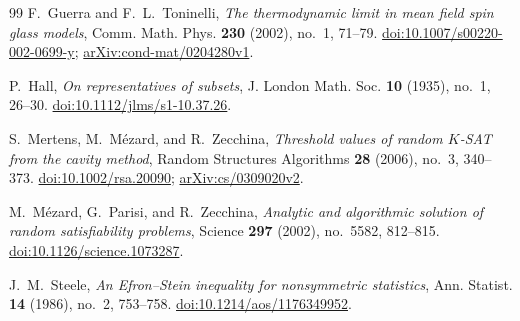 \begin{thebibliography}{99}
F.~Guerra and F.~L.~Toninelli,
\emph{The thermodynamic limit in mean field spin glass models},
Comm. Math. Phys. \textbf{230} (2002), no.~1, 71--79.
\href{https://doi.org/10.1007/s00220-002-0699-y}
{doi:10.1007/s00220-002-0699-y};
\href{https://arxiv.org/abs/cond-mat/0204280v1}{arXiv:cond-mat/0204280v1}.

P.~Hall,
\emph{On representatives of subsets},
J. London Math. Soc. \textbf{10} (1935), no.~1, 26--30.
\href{https://doi.org/10.1112/jlms/s1-10.37.26}{doi:10.1112/jlms/s1-10.37.26}.

S.~Mertens, M.~M\'ezard, and R.~Zecchina,
\emph{Threshold values of random \(K\)-SAT from the cavity method},
Random Structures Algorithms \textbf{28} (2006), no.~3, 340--373.
\href{https://doi.org/10.1002/rsa.20090}{doi:10.1002/rsa.20090};
\href{https://arxiv.org/abs/cs/0309020v2}{arXiv:cs/0309020v2}.

M.~M\'ezard, G.~Parisi, and R.~Zecchina,
\emph{Analytic and algorithmic solution of random satisfiability problems},
Science \textbf{297} (2002), no.~5582, 812--815.
\href{https://doi.org/10.1126/science.1073287}
{doi:10.1126/science.1073287}.

J.~M.~Steele,
\emph{An Efron--Stein inequality for nonsymmetric statistics},
Ann. Statist. \textbf{14} (1986), no.~2, 753--758.
\href{https://doi.org/10.1214/aos/1176349952}{doi:10.1214/aos/1176349952}.

\end{thebibliography}
\endgroup
